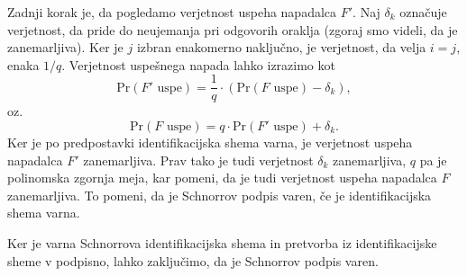 \documentclass[isrm2, tisk]{fmfdelo}
\begin{document}
\begin{dokaz}
    Zadnji korak je, da pogledamo verjetnost uspeha napadalca $F'$. Naj $\delta_k$ označuje verjetnost,
    da pride do neujemanja pri odgovorih oraklja (zgoraj smo videli, da je zanemarljiva). Ker je $j$
    izbran enakomerno naključno, je verjetnost, da velja $i=j$, enaka $1/q$. Verjetnost uspešnega
    napada lahko izrazimo kot
    $$
    \text{Pr}(F' \text{ uspe}) = \frac{1}{q} \cdot (\text{Pr}(F \text{ uspe}) - \delta_k),
    $$
    oz.
    $$
    \text{Pr}(F \text{ uspe}) = q \cdot \text{Pr}(F' \text{ uspe}) + \delta_k.
    $$
    Ker je po predpostavki identifikacijska shema varna, je verjetnost uspeha napadalca $F'$
    zanemarljiva. Prav tako je tudi verjetnost $\delta_k$ zanemarljiva, $q$ pa je polinomska zgornja
    meja, kar pomeni, da je tudi verjetnost uspeha napadalca $F$ zanemarljiva. To pomeni, da je
    Schnorrov podpis varen, če je identifikacijska shema varna.
\end{dokaz}

Ker je varna Schnorrova identifikacijska shema in pretvorba iz identifikacijske sheme v podpisno,
lahko zaključimo, da je Schnorrov podpis varen.
\end{document}
